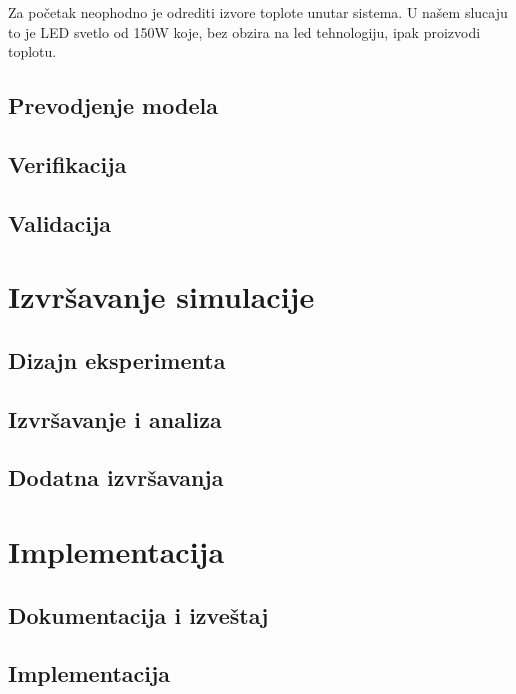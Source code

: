 \documentclass[a4paper,11pt]{book}
\begin{document}
Za početak neophodno je odrediti izvore toplote unutar sistema. U našem slucaju to je LED svetlo od 150W koje, bez obzira na led tehnologiju, ipak proizvodi toplotu.\\








\section{Prevodjenje modela}

\section{Verifikacija}

\section{Validacija}

\chapter{Izvršavanje simulacije}

\section{Dizajn eksperimenta}

\section{Izvršavanje i analiza}

\section{Dodatna izvršavanja}

\chapter{Implementacija}

\section{Dokumentacija i izveštaj}

\section{Implementacija}
\end{document}
